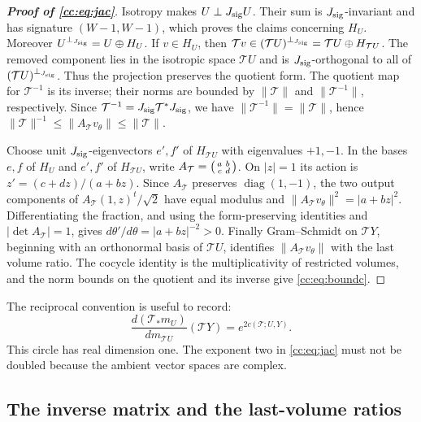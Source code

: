 \documentclass[11pt]{article}
\numberwithin{equation}{section}
\theoremstyle{remark}
\newcommand{\diag}{\operatorname{diag}}
\begin{document}
\begin{proof}[\textbf{Proof of \eqref{cc:eq:jac}}]
Isotropy makes \(U\perp J_{\rm sig}U\). Their sum is \(J_{\rm sig}\)-invariant and has
signature \((W-1,W-1)\), which proves the claims concerning \(H_U\).
Moreover \(U^{\perp_{J_{\rm sig}}}=U\oplus H_U\). If \(v\in H_U\), then
\(\mathcal T v\in(\mathcal T U)^{\perp_{J_{\rm sig}}}=\mathcal T U\oplus H_{\mathcal T U}\). The removed component lies in
the isotropic space \(\mathcal T U\) and is \(J_{\rm sig}\)-orthogonal to all of
\((\mathcal T U)^{\perp_{J_{\rm sig}}}\). Thus the projection preserves the quotient form.
The quotient map for \(\mathcal T^{-1}\) is its inverse; their norms are bounded
by \(\|\mathcal T\|\) and \(\|\mathcal T^{-1}\|\), respectively. Since
\(\mathcal T^{-1}=J_{\rm sig}\mathcal T^*J_{\rm sig}\), we have \(\|\mathcal T^{-1}\|=\|\mathcal T\|\), hence
\(\|\mathcal T\|^{-1}\le\|A_{\mathcal T}v_\theta\|\le\|\mathcal T\|\).

Choose unit $J_{\rm sig}$-eigenvectors $e',f'$ of $H_{\mathcal T U}$
with eigenvalues $+1,-1$. In the bases $e,f$ of $H_U$ and $e',f'$ of
$H_{\mathcal T U}$, write \(A_{\mathcal T}=\begin{psmallmatrix}a&b\\c&d\end{psmallmatrix}\).
On \(|z|=1\) its action is \(z'=(c+dz)/(a+bz)\).
Since \(A_{\mathcal T}\) preserves \(\diag(1,-1)\), the two output components of
\(A_{\mathcal T}(1,z)^t/\sqrt2\) have equal modulus and
\(\|A_{\mathcal T}v_\theta\|^2=|a+bz|^2\).
Differentiating the fraction, and using the form-preserving identities
and \(|\det A_{\mathcal T}|=1\), gives
\(d\theta'/d\theta=|a+bz|^{-2}>0\).
Finally Gram--Schmidt on \(\mathcal T Y\), beginning with an orthonormal basis of
\(\mathcal T U\), identifies \(\|A_{\mathcal T}v_\theta\|\) with the last volume ratio.
The cocycle identity is the multiplicativity of restricted volumes,
and the norm bounds on the quotient and its inverse give \eqref{cc:eq:boundc}.
\end{proof}

The reciprocal convention is useful to record:
\[
 \frac{d(\mathcal T_*m_U)}{dm_{\mathcal T U}}(\mathcal T Y)=e^{2c(\mathcal T;U,Y)}.
\]
This circle has real dimension one. The exponent two in
\eqref{cc:eq:jac} must not be doubled because the ambient vector spaces
are complex.

\subsection{The inverse matrix and the last-volume ratios}
\end{document}
